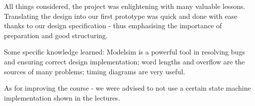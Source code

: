 All things considered, the project was enlightening with many valuable lessons. Translating the design into our first prototype was quick and done with ease thanks to our design specification - thus emphasising the importance of preparation and good structuring.

Some specific knowledge learned: Modelsim is a powerful tool in resolving bugs and ensuring correct design implementation; word lengths and overflow are the sources of many problems; timing diagrams are very useful.

As for improving the course - we were advised to not use a certain state machine implementation shown in the lectures.
	

	